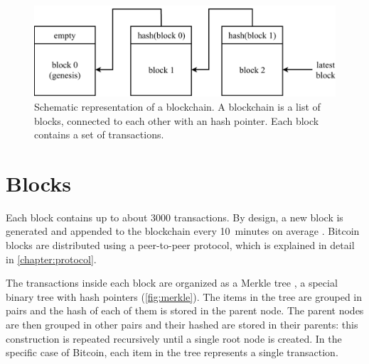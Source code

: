\begin{figure}[h]
	\centering
	\vspace*{0.25cm}
	\includegraphics[scale=0.7]{figures/blockchain}
	\vspace*{0.25cm}
	\caption[Schematic representation of a blockchain.]{
		Schematic representation of a blockchain.
		A blockchain is a list of blocks, connected to each other with an hash pointer.
		Each block contains a set of transactions.
	}
	\label{fig:blockchain}
\end{figure}

\section{Blocks}
Each block contains up to about \num{3000} transactions.
By design, a new block is generated and appended to the blockchain every \SI{10}{minutes} on average \cite{bitcoin_2009}.
Bitcoin blocks are distributed using a peer-to-peer protocol, which is explained in detail in \cref{chapter:protocol}.

The transactions inside each block are organized as a Merkle tree \cite{merkle_tree_1980}, a special binary tree with hash pointers (\cref{fig:merkle}).
The items in the tree are grouped in pairs and the hash of each of them is stored in the parent node.
The parent nodes are then grouped in other pairs and their hashed are stored in their parents:
this construction is repeated recursively until a single root node is created.
In the specific case of Bitcoin, each item in the tree represents a single transaction.

